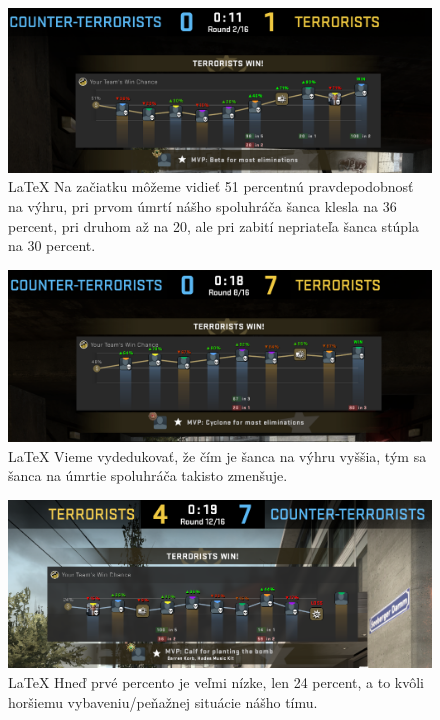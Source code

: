   
 \begin{figure}[h!]
 
 	\includegraphics[width=.9\textwidth]{figures/jednanula}
 	\centering
 	\caption{\LaTeX{} Na začiatku môžeme vidieť 51 percentnú pravdepodobnosť na výhru, pri prvom úmrtí nášho spoluhráča šanca klesla na 36 percent, pri druhom až na 20, ale pri zabití nepriateľa šanca stúpla na 30 percent.  \label{jednanula}}
 \end{figure}

  \begin{figure}[h!]
  	
\includegraphics[width=.9\textwidth]{figures/sedemnula}
\centering
\caption{\LaTeX{} Vieme vydedukovať, že čím je šanca na výhru vyššia, tým sa šanca na úmrtie spoluhráča takisto zmenšuje. 
\label{sedemnula}}
\end{figure}

\begin{figure}[h!]
	\includegraphics[width=.9\textwidth]{figures/sedemstyri}
	\centering
	\caption{\LaTeX{} Hneď prvé percento je veľmi nízke, len 24 percent, a to kvôli horšiemu vybaveniu/peňažnej situácie nášho tímu.
		\label{sedemstyri}}
\end{figure}

